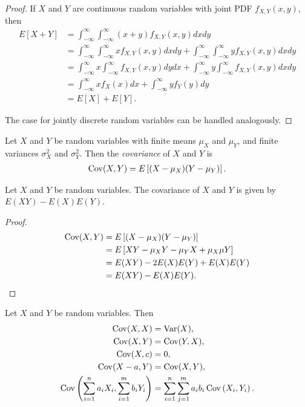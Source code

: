 \begin{proof}
    If $X$ and $Y$ are continuous random variables with joint PDF $f_{X,Y}(x,y)$, then
    \begin{align*}
        E[X + Y] &= \int_{-\infty}^{\infty}\int_{-\infty}^{\infty}\left(x + y\right)f_{X,Y}(x,y)dxdy \\ 
        &= \int_{-\infty}^{\infty}\int_{-\infty}^{\infty}xf_{X,Y}(x,y)dxdy + \int_{-\infty}^{\infty}\int_{-\infty}^{\infty}yf_{X,Y}(x,y)dxdy \\
        &= \int_{-\infty}^{\infty}x\int_{-\infty}^{\infty}f_{X,Y}(x,y)dydx + \int_{-\infty}^{\infty}y\int_{-\infty}^{\infty}f_{X,Y}(x,y)dxdy \\
        &= \int_{-\infty}^{\infty}xf_{X}(x)dx + \int_{-\infty}^{\infty}yf_{Y}(y)dy \\
        &= E[X] + E[Y].
    \end{align*}

    The case for jointly discrete random variables can be handled analogously.
\end{proof}

\begin{defn}
    Let $X$ and $Y$ be random variables with finite means $\mu_{X}$ and $\mu_{Y}$, and finite variances $\sigma_{X}^2$ and $\sigma_{Y}^2$. Then the \emph{covariance} of $X$ and $Y$ is
    \begin{align*}
        \operatorname{Cov}(X, Y) = E\left[(X - \mu_X)(Y - \mu_Y)\right].
    \end{align*}
\end{defn}

\begin{prop}
    Let $X$ and $Y$ be random variables. The covariance of $X$ and $Y$ is given by $E(XY) - E(X)E(Y)$.
\end{prop}

\begin{proof}
    \begin{align*}
        \operatorname{Cov}(X, Y) &= E\left[(X - \mu_X)(Y - \mu_Y)\right] \\
        &= E\left[XY - \mu_{X}Y - \mu_{Y}X + \mu_{X}\mu{Y}\right] \\
        &= E(XY) - 2E(X)E(Y) + E(X)E(Y) \\
        &= E(XY) - E(X)E(Y).
    \end{align*}
\end{proof}

\begin{thm}\label{covariance-properties}
    Let $X$ and $Y$ be random variables. Then
    \begin{align*}
        \operatorname{Cov}(X,X) &= \operatorname{Var}(X), \\
        \operatorname{Cov}(X,Y) &= \operatorname{Cov}(Y,X), \\
        \operatorname{Cov}(X,c) &= 0, \\
        \operatorname{Cov}(X - a, Y) &= \operatorname{Cov}(X, Y), \\
        \operatorname{Cov}\left(\sum_{i=1}^{n}a_iX_i, \sum_{i=1}^{m}b_iY_i\right) &= \sum_{i=1}^{n}\sum_{j=1}^{m}a_ib_i\operatorname{Cov}\left(X_i, Y_i\right).
    \end{align*}
\end{thm}

